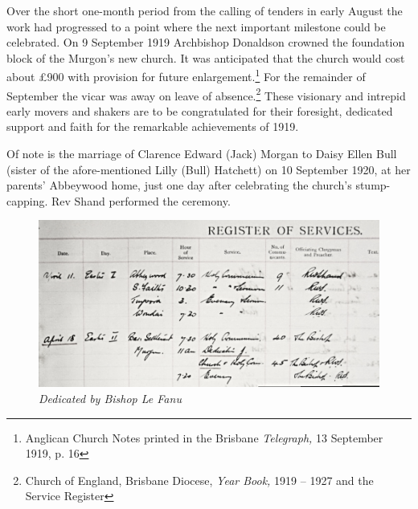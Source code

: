 Over the short one-month period from the calling of tenders in early August the work had progressed to a point where the next important milestone could be celebrated. On 9 September 1919 Archbishop Donaldson crowned the foundation block of the Murgon's new church. It was anticipated that the church would cost about \pounds900 with provision for future enlargement.\footnote{Anglican Church Notes printed in the Brisbane \emph{Telegraph,} 13 September 1919, p. 16} For the remainder of September the vicar was away on leave of absence.\footnote{Church of England, Brisbane Diocese, \emph{Year Book,} 1919 -- 1927 and the Service Register} These visionary and intrepid early movers and shakers are to be congratulated for their foresight, dedicated support and faith for the remarkable achievements of 1919.


Of note is the marriage of Clarence Edward (Jack) Morgan to Daisy Ellen Bull (sister of the afore-mentioned Lilly (Bull) Hatchett) on 10 September 1920, at her parents' Abbeywood home, just one day after celebrating the church's stump-capping. Rev Shand performed the ceremony.









\begin{figure}[!htb]
\begin{center}
\includegraphics[width=1.\textwidth,center]{../images/dedicationByBishopLeFanu.jpg}
\caption{\itshape Dedicated by Bishop Le Fanu}
\end{center}
\end{figure}




